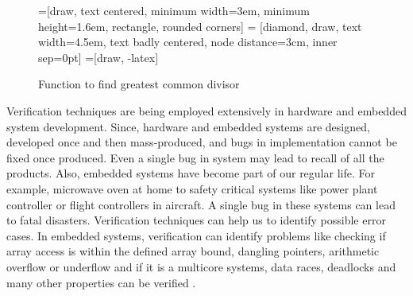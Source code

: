 \begin{figure}[h]
    \centering
    =[draw, text centered, minimum width=3em, minimum height=1.6em, rectangle, rounded corners]
     = [diamond, draw, text width=4.5em, text badly centered, node distance=3cm, inner sep=0pt]
    =[draw, -latex]
   \caption{Function to find greatest common divisor}
   \label{fig:example:test:coverage:code}
\end{figure}

Verification techniques are being employed extensively in hardware and embedded system development. Since, hardware and embedded systems are designed, developed once and then mass-produced, and bugs in implementation cannot be fixed once produced. Even a single bug in system may lead to recall of all the products. Also, embedded systems have become part of our regular life. For example, microwave oven at home to safety critical systems like power plant controller or flight controllers in aircraft. A single bug in these systems can lead to fatal disasters. Verification techniques can help us to identify possible error cases. In embedded systems, verification can identify problems like checking if array access is within the defined array bound, dangling pointers, arithmetic overflow or underflow and if it is a multicore systems, data races, deadlocks and many other properties can be verified \cite{werner2010correctness, post2007integrated, vasudevan2008static}.


